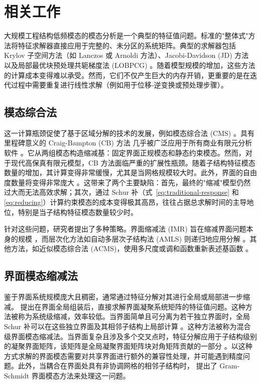 \section{相关工作}

大规模工程结构低频模态的模态分析是一个典型的特征值问题。标准的"整体式"方法将特征求解器直接应用于完整的、未分区的系统矩阵。典型的求解器包括 Krylov 子空间方法（如 Lanczos 或 Arnoldi 方法）\cite{Hernandez2005SLEPc, Qiu2015Spectra}、Jacobi-Davidson (JD) 方法 \cite{Sleijpen2000JD} 以及局部最优块预处理共轭梯度法 (LOBPCG) \cite{knyazev2001lobpcg}。随着模型规模的增加，这些方法的计算成本变得难以承受。然而，它们不仅产生巨大的内存开销，更重要的是在迭代过程中需要重复进行线性求解（例如用于位移-逆变换或预处理步骤）。

\subsection{模态综合法}

这一计算瓶颈促使了基于区域分解的技术的发展，例如模态综合法 (CMS) \cite{seshu1997substructuring, William1985CMS, bourquin1992component}。具有里程碑意义的 Craig-Bampton (CB) 方法 \cite{craig1968coupling} 几乎被广泛应用于所有商业有限元分析软件 \cite{Vysok2017CurrentCO}。它从两组模态构造缩减基：固定界面正规模态和静态约束模态。然而，对于现代高保真有限元模型，CB 方法面临严重的扩展性瓶颈。随着子结构特征模态数量的增加，其计算变得非常缓慢，尤其是当网格规模较大时。此外，界面的自由度数量将变得非常庞大 \cite{KRATTIGER2019Riview}。这带来了两个主要缺陷：首先，最终的"缩减"模型仍然过大而无法高效求解；其次，通过 Schur 补（式~\ref{eq:traditional-response} 和 \ref{eq:reducing}）计算约束模态的成本变得极其高昂，往往占据总求解时间的主导地位，特别是当子结构特征模态数量较少时。

针对这些问题，研究者提出了多种策略。界面缩减法 (IMR) 旨在缩减界面问题本身的规模 \cite{Kuether2017InterfaceReduction}，而层次化方法如自动多层次子结构法 (AMLS) 则递归地应用分解 \cite{Bennighof2004AMLS, Boo2016ErrorEstimation, Papalukopoulos2006Dynamics}。其他方法，如近似模态综合法 (ACMS)，使用多尺度或调和函数重新表述基函数 \cite{hetmaniuk2010special, hetmaniuk2014error, Heinlein2015ACMS, Madureira2025SACMS, giammatteo2024extension}。

\subsection{界面模态缩减法}

鉴于界面系统规模庞大且稠密，通常通过特征分解对其进行全局或局部进一步缩减。
\citet{Castanier20101Characteristic} 提出在界面全局组装后，直接求解界面凝聚系统矩阵的特征值问题。这种方法被称为系统级缩减，效率较低。当界面简单且可分离为若干独立界面时，全局 Schur 补可以在这些独立界面及其相邻子结构上局部计算 \citep{Cheon2023Enhanced,KRATTIGER2019Riview}。这种方法被称为混合级界面模态缩减法。当界面复杂且涉及多个交叉点时，特征分解应用于子结构级别的凝聚界面矩阵，该矩阵是全局凝聚界面矩阵块对角矩阵贡献的一部分 \cite{HONG2013403, Kuether2017Model}。以这种方式求解的界面模态需要对共享界面进行额外的兼容性处理，并可能遇到精度问题。此外，当耦合在界面处具有非协调网格的相邻子结构时，\citet{BATTIATO2018187} 提出了 Gram-Schmidt 界面模态方法来处理这一问题。

